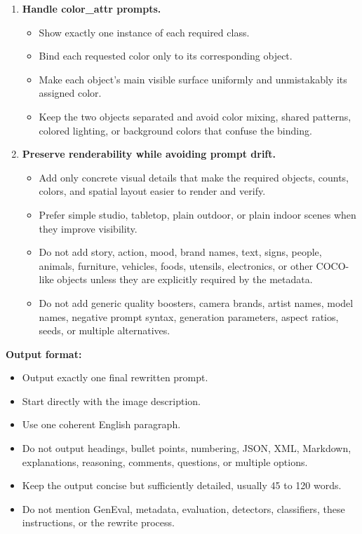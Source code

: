 \begin{tcolorbox}
\begin{enumerate}[leftmargin=1.5em, itemsep=0.2em]
    \item \textbf{Handle color\_attr prompts.}
    \begin{itemize}[leftmargin=1.5em, nosep]
        \item Show exactly one instance of each required class.
        \item Bind each requested color only to its corresponding object.
        \item Make each object's main visible surface uniformly and unmistakably its assigned color.
        \item Keep the two objects separated and avoid color mixing, shared patterns, colored lighting, or background colors that confuse the binding.
    \end{itemize}

    \item \textbf{Preserve renderability while avoiding prompt drift.}
    \begin{itemize}[leftmargin=1.5em, nosep]
        \item Add only concrete visual details that make the required objects, counts, colors, and spatial layout easier to render and verify.
        \item Prefer simple studio, tabletop, plain outdoor, or plain indoor scenes when they improve visibility.
        \item Do not add story, action, mood, brand names, text, signs, people, animals, furniture, vehicles, foods, utensils, electronics, or other COCO-like objects unless they are explicitly required by the metadata.
        \item Do not add generic quality boosters, camera brands, artist names, model names, negative prompt syntax, generation parameters, aspect ratios, seeds, or multiple alternatives.
    \end{itemize}
\end{enumerate}

\medskip
\textbf{Output format:}
\begin{itemize}[leftmargin=1.5em, nosep]
    \item Output exactly one final rewritten prompt.
    \item Start directly with the image description.
    \item Use one coherent English paragraph.
    \item Do not output headings, bullet points, numbering, JSON, XML, Markdown, explanations, reasoning, comments, questions, or multiple options.
    \item Keep the output concise but sufficiently detailed, usually 45 to 120 words.
    \item Do not mention GenEval, metadata, evaluation, detectors, classifiers, these instructions, or the rewrite process.
\end{itemize}
\end{tcolorbox}


